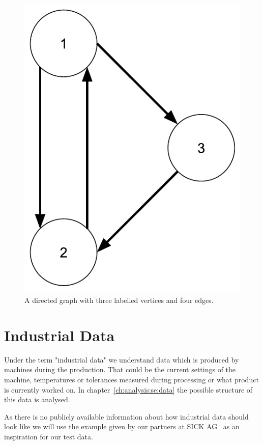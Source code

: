 \begin{figure}[h]
  \centering
  \includegraphics[width=\textwidth/4]{images/simpleGraph}
  \caption{A directed graph with three labelled vertices and four edges.}
  \label{fig:simpleGraph}
\end{figure}

\section{Industrial Data}
\label{ch:background:se:industrialData}
Under the term "industrial data" we understand data which is produced by machines during the production.
That could be the current settings of the machine,
temperatures or tolerances measured during processing or what product is currently worked on.
In chapter~\ref{ch:analysis:se:data} the possible structure of this data is analysed.

As there is no publicly available information about how industrial data should look like we will use the example given by our partners at SICK AG~\cite{SICK} as an inspiration for our test data.

